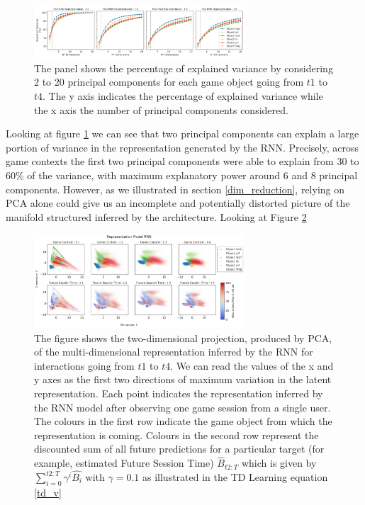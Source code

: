 \begin{figure}[h]
\centering
\includegraphics[width=0.7\textwidth]{images/chapter_4/pca_embedding.png}
\caption[\textbf{Principal component analysis of the hidden units activation of the RNN architecture }]{The panel shows the percentage of explained variance by considering 2 to 20 principal components for each game object going from $t1$ to $t4$. The y axis indicates the percentage of explained variance while the x axis the number of principal components considered.}
\label{pca_emb} 
\end{figure}
Looking at figure \ref{pca_emb} we can see that two principal components can explain a large portion of variance in the representation generated by the RNN. Precisely, across game contexts the first two principal components were able to explain from 30 to 60\% of the variance, with maximum explanatory power around 6 and 8 principal components. However, as we illustrated in section \ref{dim_reduction}, relying on PCA alone could give us an incomplete and potentially distorted picture of the manifold structured inferred by the architecture. Looking at Figure \ref{temporal_panel_rnn_pca} 
\begin{figure}[ht]
\centering
\includegraphics[width=0.7\textwidth]{images/chapter_4/rnn_future_sess_pca.png}
\caption[\textbf{Lower dimensional representation of the latent state generated by the RNN architecture using PCA}]{The figure shows the two-dimensional projection, produced by PCA, of the multi-dimensional representation inferred by the RNN for interactions going from $t1$ to $t4$. We can read the values of the x and y axes as the first two directions of maximum variation in the latent representation. Each point indicates the representation inferred by the RNN model after observing one game session from a single user. The colours in the first row indicate the game object from which the representation is coming. Colours in the second row represent the discounted sum of all future predictions for a particular target (for example, estimated Future Session Time) $\widehat{B}_{t2:T}$ which is given by $\sum_{i=0}^{t2:T} \gamma^i\widehat{B_i}$ with $\gamma=0.1$ as illustrated in the TD Learning equation \ref{td_v}}
\label{temporal_panel_rnn_pca}
\end{figure}
